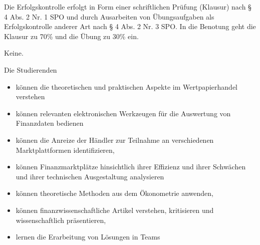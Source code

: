 \begin{course}

\setdoclanguagegerman
{}



\coursehead


\label{cour_4851.dp_997}


\begin{styleenv}
\begin{assessment}
Die Erfolgskontrolle erfolgt in Form einer schriftlichen Prüfung (Klausur) nach § 4 Abs. 2 Nr. 1 SPO und durch Ausarbeiten von Übungsaufgaben als Erfolgskontrolle anderer Art nach § 4 Abs. 2 Nr. 3 SPO. In die Benotung geht die Klausur zu 70\% und die Übung zu 30\% ein.


\end{assessment}

\begin{conditions}Keine.\end{conditions}


\end{styleenv}

\begin{learningoutcomes}
Die Studierenden

 \begin{itemize}\item können die theoretischen und praktischen Aspekte im Wertpapierhandel verstehen  \item können relevanten elektronischen Werkzeugen für die Auswertung von Finanzdaten bedienen  \item können die Anreize der Händler zur Teilnahme an verschiedenen Marktplattformen identifizieren,  \item können Finanzmarktplätze hinsichtlich ihrer Effizienz und ihrer Schwächen und ihrer technischen Ausgestaltung analysieren  \item können theoretische Methoden aus dem Ökonometrie anwenden,  \item können finanzwissenschaftliche Artikel verstehen, kritisieren und wissenschaftlich präsentieren,  \item lernen die Erarbeitung von Lösungen in Teams  \end{itemize}
\end{learningoutcomes}


\end{course}
